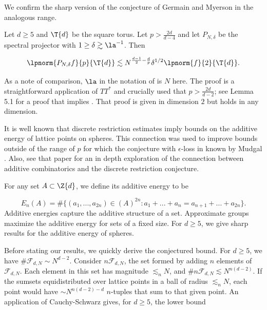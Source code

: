 \documentclass[11pt]{amsart}
\begin{document}
We confirm the sharp version of the conjecture of Germain and Myerson in the analogous range.

\begin{theorem}\label{1: specProjCorThm}
    Let $d\geq 5$ and $\T{d}$ be the square torus. Let $p>\frac{2d}{d-4}$ and let $P_{N,\delta}$ be the spectral projector with $1\geq \delta \gtrsim \la^{-1}$. Then

    \begin{equation}\label{1: specProjCorEqn}
        \lpnorm{P_{N,\delta}f}{p}{\T{d}}\lesssim N^{\frac{d-1}{2}-\frac{d}{p}}\delta^{1/2}\lpnorm{f}{2}{\T{d}}.
    \end{equation}
\end{theorem}
As a note of comparison, $\la$ in the notation of \cite{germainMyersonSpecProj2022} is $N$ here. The proof is a straightforward application of $TT^*$ and crucially used that $p>\frac{2d}{d-2}$; see \cite{demeterGermain2024} Lemma 5.1 for a proof that  implies . That proof is given in dimension $2$ but holds in any dimension.

It is well known that discrete restriction estimates imply bounds on the additive energy of lattice points on spheres. This connection was used to improve bounds outside of the range of $p$ for which the conjecture with $\epsilon$-loss in known by Mudgal \cite{mudgal2022}. Also, see that paper for an in depth exploration of the connection between additive combinatorics and the discrete restriction conjecture. 

For any set $A\subset \Z{d}$, we define its additive energy to be

\begin{equation}\label{1: additiveEnergyDef}
    E_{n}(A) = \#\{(a_1,...,a_{2n})\in (A)^{2n}: a_1+...+a_n = a_{n+1}+...+a_{2n}\}.
\end{equation}
Additive energies capture the additive structure of a set. Approximate groups maximize the additive energy for sets of a fixed size. For $d\geq 5$, we give sharp results for the additive energy of spheres.

Before stating our results, we quickly derive the conjectured bound. For $d\geq 5$, we have $\#\mathcal{F}_{d,N}\sim N^{d-2}$. Consider $n\mathcal{F}_{d,N}$, the set formed by adding $n$ elements of $\mathcal{F}_{d,N}$. Each element in this set has magnitude $\lesssim_n N$, and $\#n\mathcal{F}_{d,N}\lesssim N^{n(d-2)}$. If the sumsets equidistributed over lattice points in a ball of radius $\lesssim_n N$, each point would have $\sim N^{n(d-2)-d}$ $n$-tuples that sum to that given point. An application of Cauchy-Schwarz gives, for $d\geq 5$, the lower bound
\end{document}
